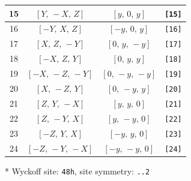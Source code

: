 \documentclass[fleqn,8pt]{jsarticle}
\begin{document}
\begin{longtable}{cccc}
15 & $\left[ Y,\, - X,\, Z \right]$ & $\left[ y,\, 0,\, y \right]$ & {\tt [15]} \\ \hline
16 & $\left[ - Y,\, X,\, Z \right]$ & $\left[ - y,\, 0,\, y \right]$ & {\tt [16]} \\ \hline
17 & $\left[ X,\, Z,\, - Y \right]$ & $\left[ 0,\, y,\, - y \right]$ & {\tt [17]} \\ \hline
18 & $\left[ - X,\, Z,\, Y \right]$ & $\left[ 0,\, y,\, y \right]$ & {\tt [18]} \\ \hline
19 & $\left[ - X,\, - Z,\, - Y \right]$ & $\left[ 0,\, - y,\, - y \right]$ & {\tt [19]} \\ \hline
20 & $\left[ X,\, - Z,\, Y \right]$ & $\left[ 0,\, - y,\, y \right]$ & {\tt [20]} \\ \hline
21 & $\left[ Z,\, Y,\, - X \right]$ & $\left[ y,\, y,\, 0 \right]$ & {\tt [21]} \\ \hline
22 & $\left[ Z,\, - Y,\, X \right]$ & $\left[ y,\, - y,\, 0 \right]$ & {\tt [22]} \\ \hline
23 & $\left[ - Z,\, Y,\, X \right]$ & $\left[ - y,\, y,\, 0 \right]$ & {\tt [23]} \\ \hline
24 & $\left[ - Z,\, - Y,\, - X \right]$ & $\left[ - y,\, - y,\, 0 \right]$ & {\tt [24]} \\
\end{longtable}
* Wyckoff site: {\tt 48h}, site symmetry: {\tt ..2}
\renewcommand{\arraystretch}{1.2}
\end{document}
